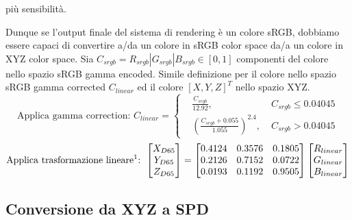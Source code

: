 pi\`u sensibilit\`a.\par
Dunque se l'output finale del sistema di rendering \`e un colore sRGB, dobbiamo essere capaci di convertire a/da un colore in sRGB color space da/a un
colore in XYZ color space. Sia $C_{srgb} = R_{srgb}|G_{srgb}|B_{srgb} \in [0,1]$ componenti del colore nello spazio sRGB gamma encoded. Simile
definizione per il colore nello spazio sRGB gamma corrected $C_{linear}$ ed il colore $[X, Y, Z]^T$ nello spazio XYZ.
\begin{equation}\label{chapter2:colorimetry:sRGB2XYZ}
	\text{Applica gamma correction: }C_{linear} = \left\{\begin{alignedat}{2}
		&\frac{C_{srgb}}{12.92}, &C_{srgb}\leq 0.04045\\
		&\left(\frac{C_{srgb}+0.055}{1.055}\right)^{2.4},\;&C_{srgb}> 0.04045
	\end{alignedat}\right.
\end{equation}
\begin{equation}
	\text{Applica trasformazione lineare\footnotemark{}: }\begin{bmatrix}
		X_{D65}\\ Y_{D65}\\ Z_{D65}
	\end{bmatrix}=
	\begin{bmatrix}
		0.4124 & 0.3576 & 0.1805 \\
		0.2126 & 0.7152 & 0.0722 \\
		0.0193 & 0.1192 & 0.9505 
	\end{bmatrix}
	\begin{bmatrix}
		R_{linear} \\ G_{linear} \\ B_{linear}
	\end{bmatrix}
\end{equation}
\subsection{Conversione da XYZ a SPD}
